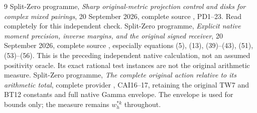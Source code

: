 \begin{thebibliography}{9}
 Split-Zero programme,
\emph{Sharp original-metric projection control and disks for complex
mixed pairings}, 20 September 2026, complete source
,
PD1--23. Read completely for this independent check.
 Split-Zero programme,
\emph{Explicit native moment precision, inverse margins, and the
original signed receiver}, 20 September 2026, complete source
,
especially equations (5), (13), (39)--(43), (51), (53)--(56).
This is the preceding independent native calculation, not an
assumed positivity oracle. Its exact rational test instances are
not the original arithmetic measure.
 Split-Zero programme,
\emph{The complete original action relative to its arithmetic total},
complete provider , CAI16--17,
retaining the original TW7 and BT12 constants and full native
Gamma envelope. The envelope is used for bounds only; the
measure remains $w_h^{*k}$ throughout.
\end{thebibliography}

\endgroup

